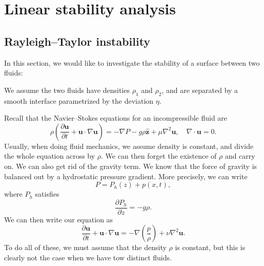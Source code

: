 \documentclass[a4paper]{article}
\begin{document}
\section{Linear stability analysis}
\subsection{Rayleigh--Taylor instability}
In this section, we would like to investigate the stability of a surface between two fluids:
\begin{center}
\end{center}
We assume the two fluids have densities $\rho_1$ and $\rho_2$, and are separated by a smooth interface parametrized by the deviation $\eta$.

Recall that the Navier--Stokes equations for an incompressible fluid are
\[
  \rho\left(\frac{\partial \mathbf{u}}{\partial t} + \mathbf{u} \cdot \nabla \mathbf{u}\right) = - \nabla P- g \rho \hat{\mathbf{z}} + \mu \nabla^2 \mathbf{u},\quad \nabla \cdot \mathbf{u} = 0.
\]
Usually, when doing fluid mechanics, we assume density is constant, and divide the whole equation across by $\rho$. We can then forget the existence of $\rho$ and carry on. We can also get rid of the gravity term. We know that the force of gravity is balanced out by a hydrostatic pressure gradient. More precisely, we can write
\[
  P = P_h(z) + p (x, t),
\]
where $P_h$ satisfies
\[
  \frac{\partial P_h}{\partial z} = -g\rho.
\]
We can then write our equation as
\[
  \frac{\partial \mathbf{u}}{\partial t} + \mathbf{u}\cdot \nabla \mathbf{u} = - \nabla \left(\frac{p}{\rho}\right) + \nu \nabla^2 \mathbf{u}.
\]
To do all of these, we must assume that the density $\rho$ is constant, but this is clearly not the case when we have tow distinct fluids.
\end{document}
